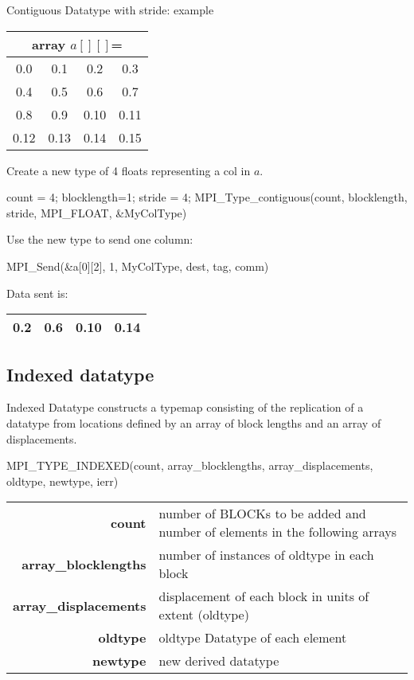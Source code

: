 \documentclass[aspectratio=43]{beamer}
\begin{document}
\begin{frame}[fragile]{Contiguous Datatype with stride: example}
\begin{center}
\begin{tabular}{|c|c|c|c|}
    \multicolumn{4}{c}{array $a[][]$=}\\\hline
0.0  & 0.1  & 0.2  & 0.3\\\hline
0.4  & 0.5  & 0.6  & 0.7\\\hline
0.8  & 0.9  & 0.10 & 0.11\\\hline
0.12 & 0.13 & 0.14 & 0.15\\\hline
\end{tabular}
\end{center}
Create a new type of 4 floats representing a col in $a$.\\
\begin{Cpplisting}[]{}
count = 4; blocklength=1; stride = 4;
MPI_Type_contiguous(count, blocklength, stride, MPI_FLOAT, &MyColType)
\end{Cpplisting}
Use the new type to send one column:\\
\begin{Cpplisting}[]{}
MPI_Send(&a[0][2], 1, MyColType, dest, tag, comm)
\end{Cpplisting}
Data sent is:
\begin{tabular}{|c|c|c|c|}
\hline
\color{cscsblue}0.2  & \color{cscsblue}0.6  & \color{cscsblue}0.10 & \color{cscsblue}0.14\\
\hline
\end{tabular}

\end{frame}

\subsection{Indexed datatype}
\begin{frame}[fragile]{Indexed Datatype}
 constructs a typemap consisting of the replication of a datatype from locations defined by an array of block lengths and an array of displacements.
\begin{Cpplisting}[]{}
MPI_TYPE_INDEXED(count, array_blocklengths, array_displacements, oldtype, newtype, ierr)
\end{Cpplisting}
\begin{black1block}{}
\begin{tabular}{rp{6.4cm}}
\textbf{count} & number of BLOCKs to be added and number of elements in the following arrays\\
\textbf{array\_blocklengths} & number of instances of oldtype in each block\\
\textbf{array\_displacements} & displacement of each block in units of extent (oldtype)\\
\textbf{oldtype} & oldtype Datatype of each element\\
\textbf{newtype} & new derived datatype\\
\end{tabular}
\end{black1block}
\end{frame}
\end{document}
